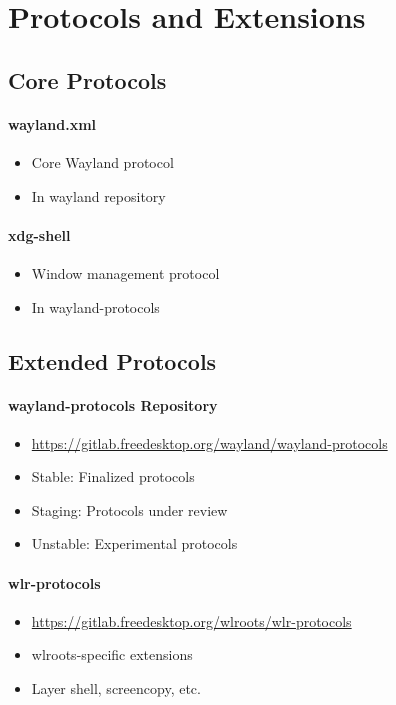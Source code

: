 \section{Protocols and Extensions}

\subsection{Core Protocols}

\paragraph{wayland.xml}
\begin{itemize}
    \item Core Wayland protocol
    \item In wayland repository
\end{itemize}

\paragraph{xdg-shell}
\begin{itemize}
    \item Window management protocol
    \item In wayland-protocols
\end{itemize}

\subsection{Extended Protocols}

\paragraph{wayland-protocols Repository}
\begin{itemize}
    \item \url{https://gitlab.freedesktop.org/wayland/wayland-protocols}
    \item Stable: Finalized protocols
    \item Staging: Protocols under review
    \item Unstable: Experimental protocols
\end{itemize}

\paragraph{wlr-protocols}
\begin{itemize}
    \item \url{https://gitlab.freedesktop.org/wlroots/wlr-protocols}
    \item wlroots-specific extensions
    \item Layer shell, screencopy, etc.
\end{itemize}

